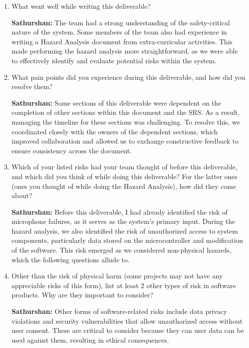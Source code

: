 \documentclass{article}
\begin{document}
\begin{enumerate}
    \item What went well while writing this deliverable? 
    
    \textbf{Sathurshan:} The team had a strong understanding of the
    safety-critical nature of the system. Some members of the team also had
    experience in writing a Hazard Analysis document from extra-curricular
    activities. This made performing the hazard analysis more straightforward,
    as we were able to effectively identify and evaluate potential risks within
    the system.

    \item What pain points did you experience during this deliverable, and how
    did you resolve them?

    \textbf{Sathurshan:} Some sections of this deliverable were dependent on the
    completion of other sections within this document and the SRS. As a result,
    managing the timeline for these sections was challenging. To resolve this,
    we coordinated closely with the owners of the dependent sections, which
    improved collaboration and allowed us to exchange constructive feedback to
    ensure consistency across the document.
    
    \item Which of your listed risks had your team thought of before this
    deliverable, and which did you think of while doing this deliverable? For
    the latter ones (ones you thought of while doing the Hazard Analysis), how
    did they come about?

    \textbf{Sathurshan:} Before this deliverable, I had already identified the
    risk of microphone failures, as it serves as the system's primary input.
    During the hazard analysis, we also identified the risk of unauthorized
    access to system components, particularly data stored on the microcontroller
    and modification of the software. This risk emerged as we considered
    non-physical hazards, which the following questions allude to.

    \item Other than the risk of physical harm (some projects may not have any
    appreciable risks of this form), list at least 2 other types of risk in
    software products. Why are they important to consider?

    \textbf{Sathurshan:} Other forms of software-related risks include data
    privacy violations and security vulnerabilities that allow unauthorized
    access without user consent. These are critical to consider because they can
    user data can be used against them, resulting in ethical consequences.

\end{enumerate}
\end{document}
